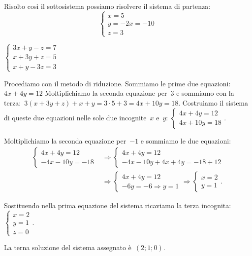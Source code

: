 \begin{soluzione}
Risolto così il sottosistema possiamo risolvere il sistema di partenza:
\[\left\{\begin{array}{l}
  x=5\\
  y=-2x=-10\\
  z=3
\end{array}\right.\]

\end{soluzione}

 \begin{esempio}
\(\left\{\begin{array}{l}3x+y-z=7\\x+3y+z=5\\x+y-3z=3\end{array}\right.\)

Procediamo con il metodo di riduzione. Sommiamo le prime due 
equazioni:~\(4x+4y=12\)
Moltiplichiamo la seconda equazione per~3 e sommiamo con la 
terza:~\(3(x+3y+z)+x+y=3\cdot 5+3=4x+10y=18\).
Costruiamo il sistema di queste due equazioni
nelle sole due incognite~\(x\) e~\(y\):
\(\left\{\begin{array}{l}4x+4y=12\\4x+10y=18\end{array}\right..\)

Moltiplichiamo la seconda equazione per~\(-1\) e sommiamo le due equazioni:
\begin{align*}
\left\{\begin{array}{l}4x+4y=12 \\-4x-10y=-18
\end{array}\right.&\Rightarrow
\left\{\begin{array}{l}4x+4y=12
\\-4x-10y+4x+4y=-18+12 \end{array}\right.\\
&\Rightarrow
\left\{\begin{array}{l}4x+4y=12 \\-6y=-6\Rightarrow
y=1 \end{array}\right.\Rightarrow
\left\{\begin{array}{l}x=2 \\y=1
\end{array}\right..
\end{align*}

Sostituendo nella prima equazione del sistema ricaviamo la terza
incognita:~\(\left\{\begin{array}{l}x=2\\y=1\\z=0\end{array}\right.\).

La terna soluzione del sistema assegnato è~\((2;1;0)\).
 \end{esempio}

